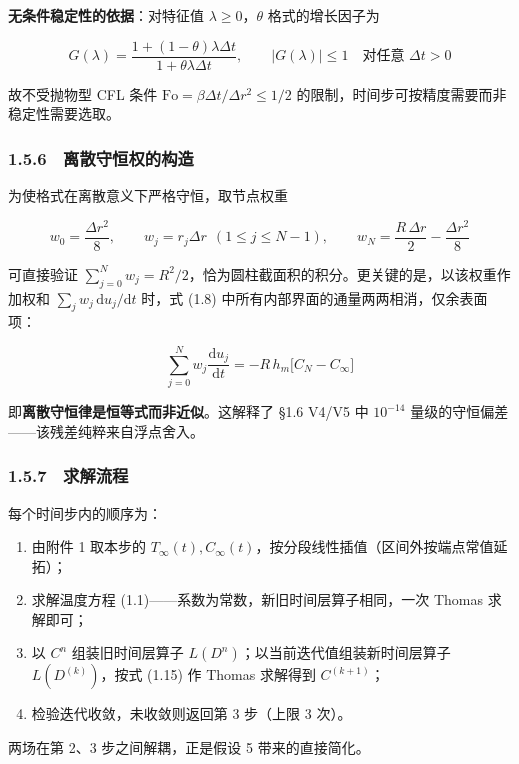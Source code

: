 \documentclass[12pt,a4paper]{ctexart}
\begin{document}
\textbf{无条件稳定性的依据}：对特征值 $\lambda\ge0$，$\theta$ 格式的增长因子为

\[
G(\lambda)=\frac{1+(1-\theta)\lambda\Delta t}{1+\theta\lambda\Delta t},
\qquad
|G(\lambda)|\le1\quad\text{对任意 }\Delta t>0
\]

故不受抛物型 CFL 条件 $\mathrm{Fo}=\beta\Delta t/\Delta r^2\le1/2$ 的限制，时间步可按精度需要而非稳定性需要选取。

\subsubsection*{1.5.6　离散守恒权的构造}

为使格式在离散意义下严格守恒，取节点权重

\begin{equation}
w_0=\frac{\Delta r^{2}}{8},\qquad
w_j=r_j\Delta r\ \ (1\le j\le N-1),\qquad
w_N=\frac{R\,\Delta r}{2}-\frac{\Delta r^{2}}{8}
\tag{1.16}
\end{equation}

可直接验证 $\sum_{j=0}^{N}w_j=R^{2}/2$，恰为圆柱截面积的积分。更关键的是，以该权重作加权和 $\sum_j w_j\,\mathrm{d}u_j/\mathrm{d}t$ 时，式 (1.8) 中所有内部界面的通量两两相消，仅余表面项：

\[
\sum_{j=0}^{N}w_j\frac{\mathrm{d}u_j}{\mathrm{d}t}=-R\,h_m\big[C_N-C_\infty\big]
\]

即\textbf{离散守恒律是恒等式而非近似}。这解释了 §1.6 V4/V5 中 $10^{-14}$ 量级的守恒偏差——该残差纯粹来自浮点舍入。

\subsubsection*{1.5.7　求解流程}

每个时间步内的顺序为：

\begin{enumerate}[label=\arabic*.]
\item 由附件 1 取本步的 $T_\infty(t),C_\infty(t)$，按分段线性插值（区间外按端点常值延拓）；
\item 求解温度方程 (1.1)——系数为常数，新旧时间层算子相同，一次 Thomas 求解即可；
\item 以 $C^n$ 组装旧时间层算子 $L(D^n)$；以当前迭代值组装新时间层算子 $L(D^{(k)})$，按式 (1.15) 作 Thomas 求解得到 $C^{(k+1)}$；
\item 检验迭代收敛，未收敛则返回第 3 步（上限 3 次）。
\end{enumerate}

两场在第 2、3 步之间解耦，正是假设 5 带来的直接简化。
\end{document}
